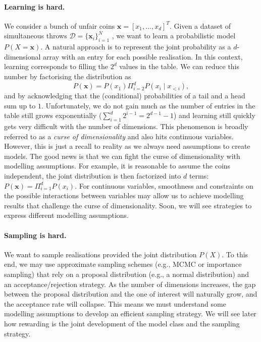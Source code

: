 \paragraph{Learning is hard.} We consider a bunch of unfair coins $\bm{x} = \left[x_1, \dots, x_d \right]^T$. Given a dataset of simultaneous throws $\mathcal{D} = \{\bm{x}_i\}_{i=1}^N$ , we want to learn a probabilistic model $P(X=\bm{x})$. A natural approach is to represent the joint probability as a $d$-dimensional array with an entry for each possible realisation. In this context, learning corresponds to filling the $2^d$ values in the table. We can reduce this number by factorising the distribution as
$$P(\bm{x}) = P(x_1)\Pi_{i=2}^d P(x_i\mid x_{<i}),$$ and by acknowledging that the (conditional) probabilities of a tail and a head sum up to $1$. Unfortunately, we do not gain much as the number of entries in the table still grows exponentially ($\sum_{i=1}^d 2^{i-1} = 2^{d-1} - 1$) and learning still quickly gets very difficult with the number of dimensions. This phenomenon is broadly referred to as a \textit{curse of dimensionality} and also hits continuous variables. However, this is just a recall to reality as we always need assumptions to create models. The good news is that we can fight the curse of dimensionality with modelling assumptions. For example, it is reasonable to assume the coins independent, the joint distribution is then factorized into $d$ terms: $ P(\bm{x}) = \Pi_{i=1}^d P(x_i)$. For continuous variables, smoothness and constraints on the possible interactions between variables may allow us to achieve modelling results that challenge the curse of dimensionality. Soon, we will see strategies to express different modelling assumptions.

\paragraph{Sampling is hard.} We want to sample realisations provided the joint distribution $P(X)$. To this end, we may use approximate sampling schemes (e.g., MCMC or importance sampling) that rely on a proposal distribution (e.g., a normal distribution) and an acceptance/rejection strategy. As the number of dimensions increases, the gap between the proposal distribution and the one of interest will naturally grow, and the acceptance rate will collapse. This means we must understand some modelling assumptions to develop an efficient sampling strategy. We will see later how rewarding is the joint development of the model class and the sampling strategy.

